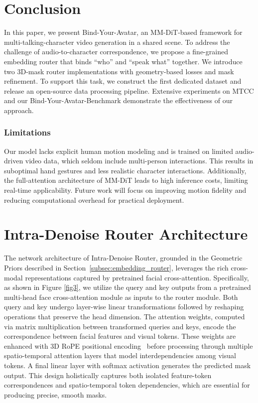 \section{Conclusion}
In this paper, we present Bind-Your-Avatar, an MM-DiT-based framework for multi-talking-character video generation in a shared scene. To address the challenge of audio-to-character correspondence, we propose a fine-grained embedding router that binds “who” and “speak what” together. We introduce two 3D-mask router implementations with geometry-based losses and mask refinement. To support this task, we construct the first dedicated dataset and release an open-source data processing pipeline. Extensive experiments on MTCC and our Bind-Your-Avatar-Benchmark demonstrate the effectiveness of our approach.
\subsubsection{Limitations}
Our model lacks explicit human motion modeling and is trained on limited audio-driven video data, which seldom include multi-person interactions. This results in suboptimal hand gestures and less realistic character interactions. Additionally, the full-attention architecture of MM-DiT leads to high inference costs, limiting real-time applicability. Future work will focus on improving motion fidelity and reducing computational overhead for practical deployment.
\appendix
\section{Intra-Denoise Router Architecture}
The network architecture of Intra-Denoise Router, grounded in the Geometric Priors described in Section~\ref{subsec:embedding_router}, leverages the rich cross-modal representations captured by pretrained facial cross-attention. Specifically, as shown in Figure \ref{fig3}, we utilize the query and key outputs from a pretrained multi-head face cross-attention module as inputs to the router module. Both query and key undergo layer-wise linear transformations followed by reshaping operations that preserve the head dimension. The attention weights, computed via matrix multiplication between transformed queries and keys, encode the correspondence between facial features and visual tokens. These weights are enhanced with 3D RoPE positional encoding~\cite{su2024roformer} before processing through multiple spatio-temporal attention layers that model interdependencies among visual tokens. A final linear layer with softmax activation generates the predicted mask output. This design holistically captures both isolated feature-token correspondences and spatio-temporal token dependencies, which are essential for producing precise, smooth masks.
